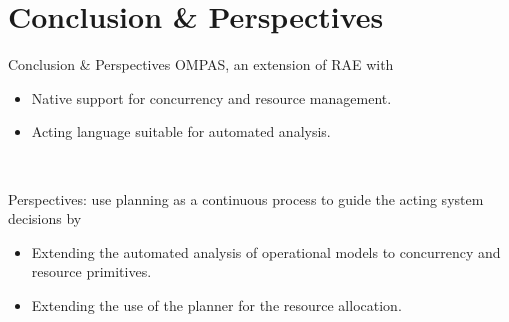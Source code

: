 \section{Conclusion \& Perspectives}
\begin{frame}[c]{Conclusion \& Perspectives}
    OMPAS, an extension of RAE with
    \begin{itemize}
        \pause
        \item Native support for concurrency and resource management.
        \pause
        \item Acting language suitable for automated analysis.
    \end{itemize}
    
    ~~

    \pause
    Perspectives: use planning as a continuous process to guide the acting system decisions by
    \begin{itemize}
        \pause
        \item Extending the automated analysis of operational models \footnotemark[1]  to concurrency and resource primitives.
        \pause
        \item Extending the use of the planner for the resource allocation.
    \end{itemize}
\end{frame}

